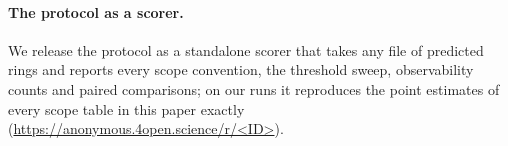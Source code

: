 \paragraph{The protocol as a scorer.}
We release the protocol as a standalone scorer that takes any file of predicted rings and
reports every scope convention, the threshold sweep, observability counts and paired
comparisons; on our runs it reproduces the point estimates of every scope table in this paper
exactly (\url{https://anonymous.4open.science/r/<ID>}).
